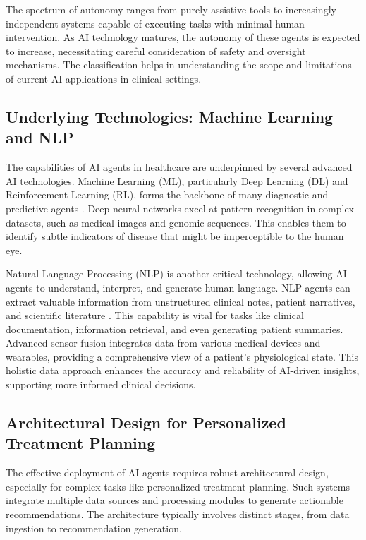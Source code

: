 \documentclass[12pt,a4paper]{article}
\begin{document}
The spectrum of autonomy ranges from purely assistive tools to increasingly independent systems capable of executing tasks with minimal human intervention. As AI technology matures, the autonomy of these agents is expected to increase, necessitating careful consideration of safety and oversight mechanisms. The classification helps in understanding the scope and limitations of current AI applications in clinical settings.

\subsection{Underlying Technologies: Machine Learning and NLP}
\label{sec:core_technologies}
The capabilities of AI agents in healthcare are underpinned by several advanced AI technologies. Machine Learning (ML), particularly Deep Learning (DL) and Reinforcement Learning (RL), forms the backbone of many diagnostic and predictive agents \cite{lecun2015deep}. Deep neural networks excel at pattern recognition in complex datasets, such as medical images and genomic sequences. This enables them to identify subtle indicators of disease that might be imperceptible to the human eye.

Natural Language Processing (NLP) is another critical technology, allowing AI agents to understand, interpret, and generate human language. NLP agents can extract valuable information from unstructured clinical notes, patient narratives, and scientific literature \cite{topol2019deep}. This capability is vital for tasks like clinical documentation, information retrieval, and even generating patient summaries. Advanced sensor fusion integrates data from various medical devices and wearables, providing a comprehensive view of a patient's physiological state. This holistic data approach enhances the accuracy and reliability of AI-driven insights, supporting more informed clinical decisions.

\subsection{Architectural Design for Personalized Treatment Planning}
\label{sec:architecture}
The effective deployment of AI agents requires robust architectural design, especially for complex tasks like personalized treatment planning. Such systems integrate multiple data sources and processing modules to generate actionable recommendations. The architecture typically involves distinct stages, from data ingestion to recommendation generation.
\end{document}
